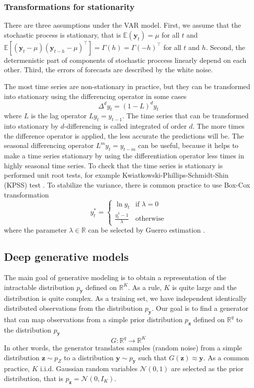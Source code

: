 \documentclass[12pt,a4paper]{article}
\begin{document}
\subsubsection{Transformations for stationarity}

There are three assumptions under the VAR model. First, we assume that the stochastic process is stationary, that is $\mathbb E (\mathbf y_t) = \mu$ for all $t$ and $\mathbb E [(\mathbf y_t - \mu)(\mathbf y_{t-h}-\mu)^\top] = \Gamma(h) = \Gamma(-h)^\top$ for all $t$ and $h$. Second, the determenistic part of components of stochastic proccess linearly depend on each other. Third, the errors of forecasts are described by the white noise.

The most time series are non-stationary in practice, but they can be transformed into stationary using the differencing operator in some cases
$$\Delta^d y_t = (1 - L)^d y_t$$
where $L$ is the lag operator $Ly_t = y_{t-1}$. The time series that can be transformed into stationary by $d$-differencing is called integrated of order $d$. The more times the difference operator is applied, the less accurate the predictions will be. The seasonal differencing operator $L^my_t = y_{t-m}$ can be useful, because it helps to make a time series stationary by using the differentiation operator less times in highly seasonal time series. To check that the time series is stationary is performed unit root tests, for example Kwiatkowski-Phillips-Schmidt-Shin (KPSS) test \cite{fpp3}. To stabilize the variance, there is common practice to use Box-Cox transformation
$$y_t^* = \begin{cases}
    \ln y_t & \text{if $\lambda = 0$} \\ 
    \frac{y_t^\lambda - 1}{\lambda} & \text{otherwise}
\end{cases}$$
where the parameter $\lambda \in \mathbb R$ can be selected by Guerro estimation \cite{guerrero93}.

\subsection{Deep generative models} \label{deepgenmodels}

The main goal of generative modeling is to obtain a representation of the intractable distribution $p_\mathbf y$ defined on $\mathbb R^K$. As a rule, $K$ is quite large and the distribution is quite complex. As a training set, we have independent identically distributed observations from the distribution $p_\mathbf y$. Our goal is to find a generator that can map observations from a simple prior distribution $p_\mathbf z$ defined on $\mathbb R^q$ to the distribution $p_\mathbf y$
$$G: \mathbb R^q \to \mathbb R^K$$
In other words, the generator translates samples (random noise) from a simple distribution $\mathbf z \sim p_Z$ to a distribution $\mathbf y \sim p_\mathbf y$ such that $G(\mathbf z) \approx \mathbf y$. As a common practice, $K$ i.i.d. Gaussian random variables $\mathcal N(0, 1)$ are selected as the prior distribution, that is $p_{\mathbf z} = \mathcal N(0, I_K)$.
\end{document}
